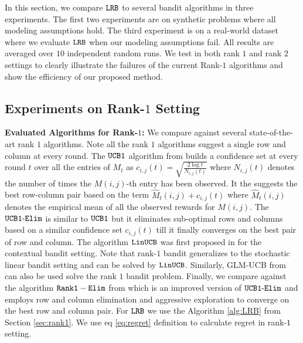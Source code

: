 In this section, we compare ${\tt LRB}$ to several bandit algorithms in three experiments. The first two experiments are on synthetic problems where all modeling assumptions hold. The third experiment is on a real-world dataset where we evaluate ${\tt LRB}$ when our modeling assumptions fail. All results are averaged over $10$ independent random runs. We test in both rank $1$ and rank $2$ settings to clearly illustrate the failures of the current Rank-$1$ algorithms and show the efficiency of our proposed method. 



\subsection{Experiments on Rank-$1$ Setting}

\textbf{Evaluated Algorithms for Rank-$1$:} We compare against several state-of-the-art rank $1$ algorithms. Note all the rank $1$ algorithms suggest a single row and column at every round. The ${\tt UCB1}$ algorithm from \citet{auer2002finite} builds a confidence set at every round $t$ over all the entries of $M_t$ as $c_{i, j}(t) = \sqrt{\frac{2\log t}{N_{i, j}(t)}}$ where $N_{i, j}(t)$ denotes the number of times the $M(i,j)$-th entry has been observed. It the suggests the best row-column pair based on the term $\hat{M}_{t}(i,j) + c_{i, j}(t)$ where $\hat{M}_{t}(i,j)$ denotes the empirical mean of all the observed rewards for $M(i,j)$. The ${\tt UCB1\mbox{-}Elim}$ \citep{auer2010ucb} is similar to ${\tt UCB1}$ but it eliminates sub-optimal rows and columns  based on a similar confidence set  $c_{i, j}(t)$ till it finally converges on the best pair of row and column. The algorithm ${\tt LinUCB}$ was first proposed in \citet{li2010contextual} for the contextual bandit setting. Note that rank-$1$ bandit generalizes to the stochastic linear bandit setting and can be solved by ${\tt LinUCB}$. Similarly, GLM-UCB from \citet{filippi2010parametric} can also be used solve the rank $1$ bandit problem. Finally, we compare against the algorithm $\tt Rank1-Elim$ from \citet{katariya2016stochastic} which is an improved version of ${\tt UCB1\mbox{-}Elim}$ and employs row and column elimination and aggressive exploration to converge on the best row and column pair. For ${\tt LRB}$ we use the Algorithm \ref{alg:LRB} from Section \ref{sec:rank1}. We use eq \eqref{eq:regret} definition to calculate regret in rank-$1$ setting.

